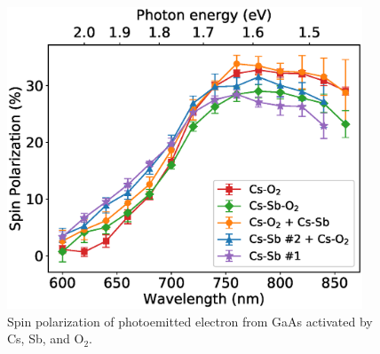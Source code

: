 \begin{figure}
	\centering
	\includegraphics*[width=300pt]{figs/CsSbO/pol.eps}
	\caption{Spin polarization of photoemitted electron from GaAs activated by Cs, Sb, and O$_2$.}
	\label{fig_polarization}
\end{figure}

